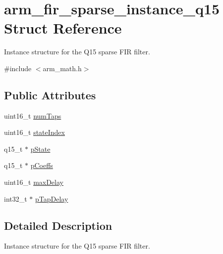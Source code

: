 \hypertarget{structarm__fir__sparse__instance__q15}{\section{arm\-\_\-fir\-\_\-sparse\-\_\-instance\-\_\-q15 Struct Reference}
\label{structarm__fir__sparse__instance__q15}
}


Instance structure for the Q15 sparse F\-I\-R filter.  




{\ttfamily \#include $<$arm\-\_\-math.\-h$>$}

\subsection*{Public Attributes}
\begin{DoxyCompactItemize}
\item 
uint16\-\_\-t \hyperlink{structarm__fir__sparse__instance__q15_a0f66b126dd8b85f7467cfb01b7bc4d77}{num\-Taps}
\item 
uint16\-\_\-t \hyperlink{structarm__fir__sparse__instance__q15_a89487f28cab52637426024005e478985}{state\-Index}
\item 
q15\-\_\-t $\ast$ \hyperlink{structarm__fir__sparse__instance__q15_a98b92b0f5208110129b9a67b1db90408}{p\-State}
\item 
q15\-\_\-t $\ast$ \hyperlink{structarm__fir__sparse__instance__q15_a78a6565473b5f0b8c77c3f0f58a76069}{p\-Coeffs}
\item 
uint16\-\_\-t \hyperlink{structarm__fir__sparse__instance__q15_ad14cc1070eecf7e1926d8f67a8273182}{max\-Delay}
\item 
int32\-\_\-t $\ast$ \hyperlink{structarm__fir__sparse__instance__q15_aeab2855176c6efdb231a73a3672837d5}{p\-Tap\-Delay}
\end{DoxyCompactItemize}


\subsection{Detailed Description}
Instance structure for the Q15 sparse F\-I\-R filter. 

